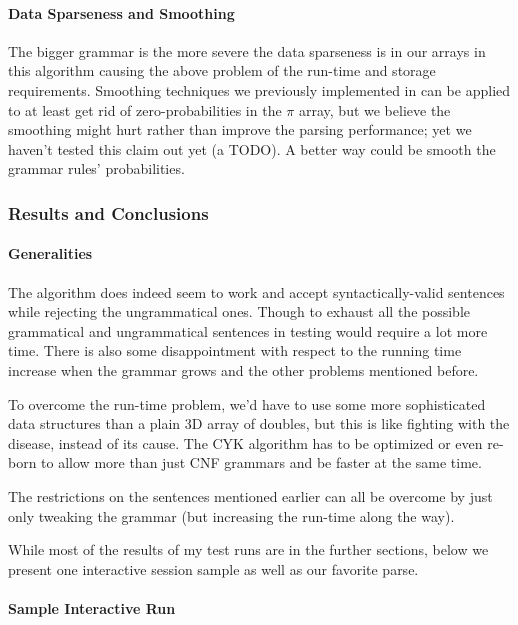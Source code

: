 \paragraph*{Data Sparseness and Smoothing}

The bigger grammar is the more severe the data sparseness is in our arrays
in this algorithm causing the above problem of the run-time and storage
requirements. Smoothing techniques we previously implemented in 
can be applied to at least get rid of zero-probabilities in the $\pi$ array, but we believe
the smoothing might hurt rather than improve the parsing performance;
yet we haven't tested this claim out yet (a TODO). A better way could be smooth
the grammar rules' probabilities.



\subsubsection{Results and Conclusions}

\paragraph{Generalities}

The algorithm does indeed seem to work and accept
syntactically-valid sentences while rejecting the ungrammatical
ones. Though to exhaust all the possible grammatical
and ungrammatical sentences in testing would require a lot more time.
There is also some disappointment
with respect to the running time increase when
the grammar grows and the other problems mentioned before.

To overcome the run-time problem, we'd have to use some
more sophisticated data structures than a plain 3D array
of doubles, but this is like fighting with the disease, instead
of its cause. The CYK algorithm has to be optimized
or even re-born to allow more than just CNF grammars
and be faster at the same time.

The restrictions on the sentences mentioned earlier can all
be overcome by just only tweaking the grammar (but increasing
the run-time along the way).

While most of the results of my test runs are in the further sections,
below we present one interactive session sample as well
as our favorite parse.

\paragraph{Sample Interactive Run}

